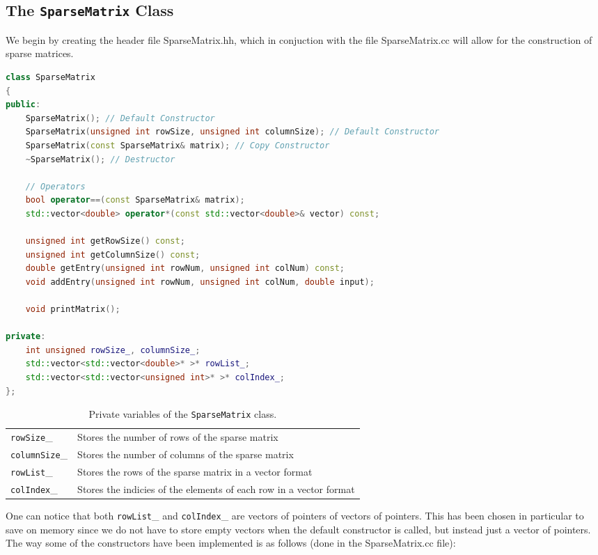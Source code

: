 \documentclass[a4paper,11pt]{article}
\theoremstyle{break}
\theoremstyle{break2}
\theoremstyle{break}
\theoremstyle{break2}
\begin{document}
\subsection{The \texttt{SparseMatrix} Class}
We begin by creating the header file SparseMatrix.hh, which in conjuction with the file SparseMatrix.cc will allow for the construction of sparse matrices.
\begin{lstlisting}[language=c++]
class SparseMatrix
{
public:
	SparseMatrix(); // Default Constructor
	SparseMatrix(unsigned int rowSize, unsigned int columnSize); // Default Constructor
	SparseMatrix(const SparseMatrix& matrix); // Copy Constructor
	~SparseMatrix(); // Destructor

	// Operators
	bool operator==(const SparseMatrix& matrix);
	std::vector<double> operator*(const std::vector<double>& vector) const;

	unsigned int getRowSize() const;
	unsigned int getColumnSize() const;
	double getEntry(unsigned int rowNum, unsigned int colNum) const;
	void addEntry(unsigned int rowNum, unsigned int colNum, double input);

	void printMatrix();

private:
	int unsigned rowSize_, columnSize_;
	std::vector<std::vector<double>* >* rowList_;
	std::vector<std::vector<unsigned int>* >* colIndex_;
};
\end{lstlisting}
\begin{table}[h!]
	\begin{tabular}{l|l}
		\texttt{rowSize}\_ & Stores the number of rows of the sparse matrix \\
		\texttt{columnSize}\_ & Stores the number of columns of the sparse matrix \\
		\texttt{rowList}\_ & Stores the rows of the sparse matrix in a vector format \\
		\texttt{colIndex}\_ & Stores the indicies of the elements of each row in a vector format \\
	\end{tabular}
\caption{Private variables of the \texttt{SparseMatrix} class.}
\end{table}
One can notice that both \texttt{rowList}\_ and \texttt{colIndex}\_ are vectors of pointers of vectors of pointers. This has been chosen in particular to save on memory since we do not have to store empty vectors when the default constructor is called, but instead just a vector of pointers. The way some of the constructors have been implemented is as follows (done in the SparseMatrix.cc file):
\end{document}
